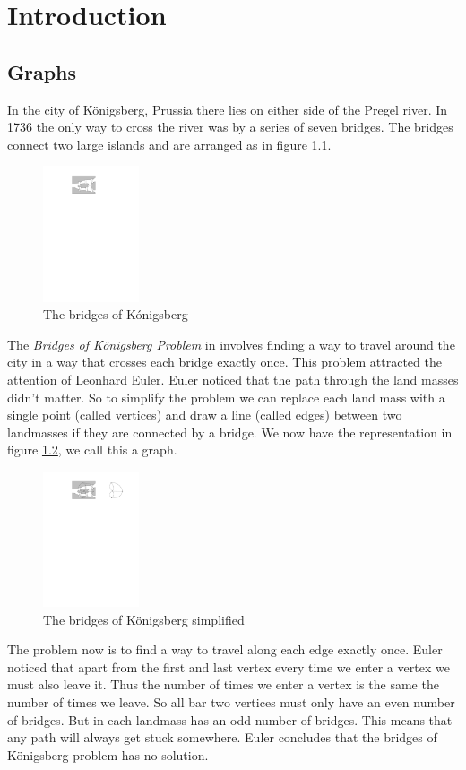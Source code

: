 \chapter{Introduction}\label{chpt:into}

\section{Graphs}
In the city of K\"{o}nigsberg, Prussia there lies on either side of the Pregel river. In 1736 the only way to cross the river was by a series of seven bridges. The bridges connect two large islands and are arranged as in figure \ref{fig:bridges1}. 
\begin{figure}[h]
    \centering
    \includegraphics[height=40mm]{images/161-fig26}  %
    \caption{The bridges of K\'{o}nigsberg}
    \label{fig:bridges1}
\end{figure}
The \textit{Bridges of K\"{o}nigsberg Problem} in involves finding a way to travel around the city in a way that crosses each bridge exactly once. This problem attracted the attention of Leonhard Euler. Euler noticed that the path through the land masses didn't matter. So to simplify the problem we can replace each land mass with a single point (called vertices) and draw a line (called edges) between two landmasses if they are connected by a bridge. We now have the representation in figure \ref{fig:bridges2}, we call this a graph.
\begin{figure} [h]
    \centering
        \includegraphics[height=40mm]{images/161-fig27}
    \caption{The bridges of K\"{o}nigsberg simplified}
    \label{fig:bridges2}
\end{figure} 
The problem now is to find a way to travel along each edge exactly once. Euler noticed that apart from the first and last vertex every time we enter a vertex we must also leave it. Thus the number of times we enter a vertex is the same the number of times we leave. So all bar two vertices must only have an even number of bridges. But in each landmass has an odd number of bridges. This means that any path will always get stuck somewhere. Euler concludes that the bridges of K\"{o}nigsberg problem has no solution.

